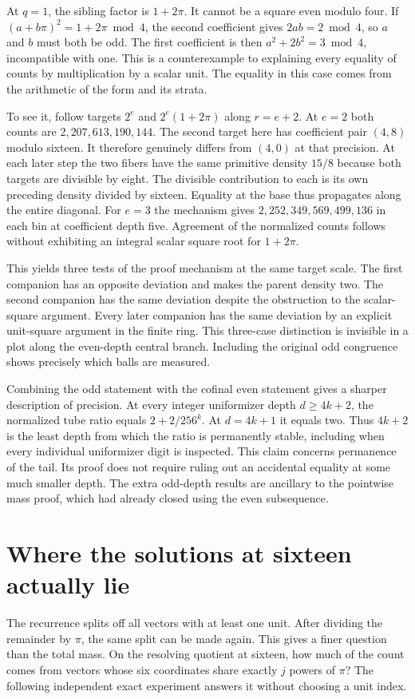 \documentclass[12pt,letterpaper]{article}
\begin{document}
At $q=1$, the sibling factor is $1+2\pi$. It cannot be a square even modulo four. If $(a+b\pi)^2=1+2\pi\bmod4$, the second coefficient gives $2ab=2\bmod4$, so $a$ and $b$ must both be odd. The first coefficient is then $a^2+2b^2=3\bmod4$, incompatible with one. This is a counterexample to explaining every equality of counts by multiplication by a scalar unit. The equality in this case comes from the arithmetic of the form and its strata.

To see it, follow targets $2^e$ and $2^e(1+2\pi)$ along $r=e+2$. At $e=2$ both counts are $2{,}207{,}613{,}190{,}144$. The second target here has coefficient pair $(4,8)$ modulo sixteen. It therefore genuinely differs from $(4,0)$ at that precision. At each later step the two fibers have the same primitive density $15/8$ because both targets are divisible by eight. The divisible contribution to each is its own preceding density divided by sixteen. Equality at the base thus propagates along the entire diagonal. For $e=3$ the mechanism gives $2{,}252{,}349{,}569{,}499{,}136$ in each bin at coefficient depth five. Agreement of the normalized counts follows without exhibiting an integral scalar square root for $1+2\pi$.

This yields three tests of the proof mechanism at the same target scale. The first companion has an opposite deviation and makes the parent density two. The second companion has the same deviation despite the obstruction to the scalar-square argument. Every later companion has the same deviation by an explicit unit-square argument in the finite ring. This three-case distinction is invisible in a plot along the even-depth central branch. Including the original odd congruence shows precisely which balls are measured.

Combining the odd statement with the cofinal even statement gives a sharper description of precision. At every integer uniformizer depth $d\ge4k+2$, the normalized tube ratio equals $2+2/256^k$. At $d=4k+1$ it equals two. Thus $4k+2$ is the least depth from which the ratio is permanently stable, including when every individual uniformizer digit is inspected. This claim concerns permanence of the tail. Its proof does not require ruling out an accidental equality at some much smaller depth. The extra odd-depth results are ancillary to the pointwise mass proof, which had already closed using the even subsequence.

\section{Where the solutions at sixteen actually lie}
The recurrence splits off all vectors with at least one unit. After dividing the remainder by $\pi$, the same split can be made again. This gives a finer question than the total mass. On the resolving quotient at sixteen, how much of the count comes from vectors whose six coordinates share exactly $j$ powers of $\pi$? The following independent exact experiment answers it without choosing a unit index.
\end{document}
